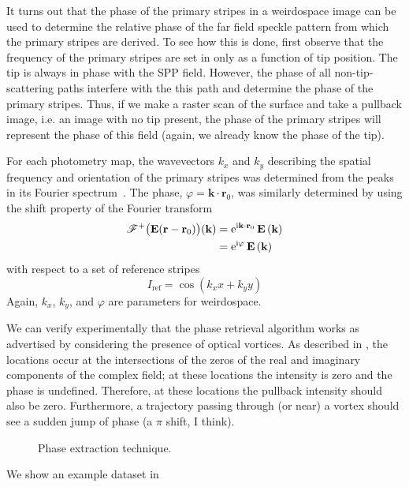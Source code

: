 It turns out that the phase of the primary stripes in a weirdospace image
can be used to determine the relative phase of the far field speckle
pattern from which the primary stripes are derived.  To see how this is
done, first observe that the frequency of the primary stripes are set in
 only as a function of tip position.  The tip
is always in phase with the SPP field.  However, the phase of all
non-tip-scattering paths interfere with the this path and determine the
phase of the primary stripes.  Thus, if we make a raster scan of the
surface and take a pullback image, i.e. an image with no tip present, the
phase of the primary stripes will represent the phase of this field (again,
we already know the phase of the tip).

For each photometry map, the wavevectors $k_x$ and $k_y$ describing the
spatial frequency and orientation of the primary stripes was determined
from the peaks in its Fourier spectrum~\cite{huntley1986speckle}.  The
phase, $\varphi=\mathbf{k}\cdot\mathbf{r}_0$, was similarly determined
by using the shift property of the Fourier transform
\begin{align}
{\mathscr{F}^{+}\bigl(\mathbf{E}(\mathbf{r}-\mathbf{r}_0)\bigr)}(\mathbf{k}) &= 
{\mathrm{e}}^{{\mathrm{i}} \mathbf{k}\cdot \mathbf{r}_0}\,
\mathbf{E}\left(\mathbf{k}\right)\\
&= {\mathrm{e}}^{{\mathrm{i}} \varphi}\, \mathbf{E}\left(\mathbf{k}\right)
\end{align}
with respect to a set of reference stripes
\begin{equation}
I_\mathrm{ref} = \cos(k_x x + k_y y)
\end{equation}
Again, $k_x$, $k_y$, and $\varphi$ are parameters for weirdospace.

We can verify experimentally that the phase retrieval algorithm works as
advertised by considering the presence of optical vortices.  As described
in , the locations occur at the intersections of the zeros
of the real and imaginary components of the complex field; at these
locations the intensity is zero and the phase is undefined.  Therefore, at
these locations the pullback intensity should also be zero.  Furthermore, a
trajectory passing through (or near) a vortex should see a sudden jump of
phase (a $\pi$ shift, I think).

\begin{figure}
\centering
\caption{Phase extraction technique.}
\label{fig:phaseextractiontechnique}
\end{figure}

We show an example dataset in 
